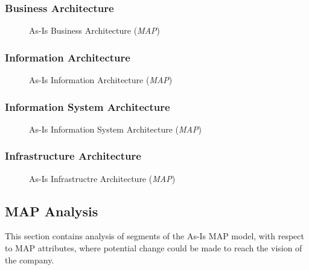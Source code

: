 \subsubsection{Business Architecture}
\begin{center}
	\begin{figure}[H]
		\centering
		\setlength\fboxsep{7pt}
		\setlength\fboxrule{0.5pt}
		\caption{As-Is Business Architecture (\emph{MAP})}
		\label{fig:map_business_as_is}
	\end{figure}
\end{center}
%
\subsubsection{Information Architecture}
\begin{center}
	\begin{figure}[H]
		\centering
		\setlength\fboxsep{7pt}
		\setlength\fboxrule{0.5pt}
		\caption{As-Is Information Architecture (\emph{MAP})}
		\label{fig:map_application_as_is}
	\end{figure}
\end{center}
%
\subsubsection{Information System Architecture}
\begin{center}
	\begin{figure}[H]
		\centering
		\setlength\fboxsep{7pt}
		\setlength\fboxrule{0.5pt}
		\caption{As-Is Information System Architecture (\emph{MAP})}
		\label{fig:map_information_as_is}
	\end{figure}
\end{center}
%
\subsubsection{Infrastructure Architecture}
\begin{center}
	\begin{figure}[H]
		\centering
		\setlength\fboxsep{7pt}
		\setlength\fboxrule{0.5pt}
		\caption{As-Is Infrastructre Architecture (\emph{MAP})}
		\label{fig:map_information_as_is}
	\end{figure}
\end{center}
\subsection{MAP Analysis}
\label{sec:map_analysis}
This section contains analysis of segments of the As-Is MAP model, with respect to MAP attributes, where potential change could be made to reach the vision of the company.
